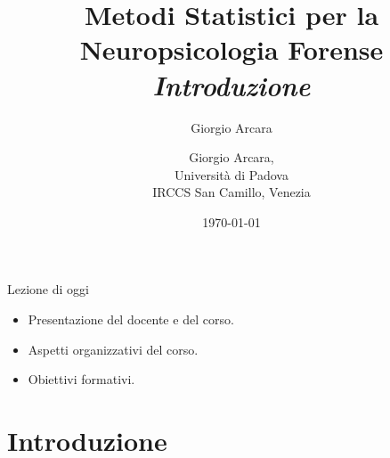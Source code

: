 \documentclass[
  ignorenonframetext,
]{beamer}
\author{Giorgio Arcara}
\date{}
\providecommand{\tightlist}{%
  \setlength{\itemsep}{0pt}\setlength{\parskip}{0pt}}
\begin{document}
\begin{frame}
\title{Metodi Statistici per la Neuropsicologia Forense\\ \vspace{1em} \emph{Introduzione}}
\author{Giorgio Arcara,\\ Università di Padova \\ IRCCS San Camillo, Venezia}

\date{\today}
\maketitle
\end{frame}

\begin{frame}{Lezione di oggi}
\label{lezione-di-oggi}
\begin{itemize}
\tightlist
\item
  Presentazione del docente e del corso.
\item
  Aspetti organizzativi del corso.
\item
  Obiettivi formativi.
\end{itemize}
\end{frame}

\section{Introduzione}\label{introduzione}
\end{document}
